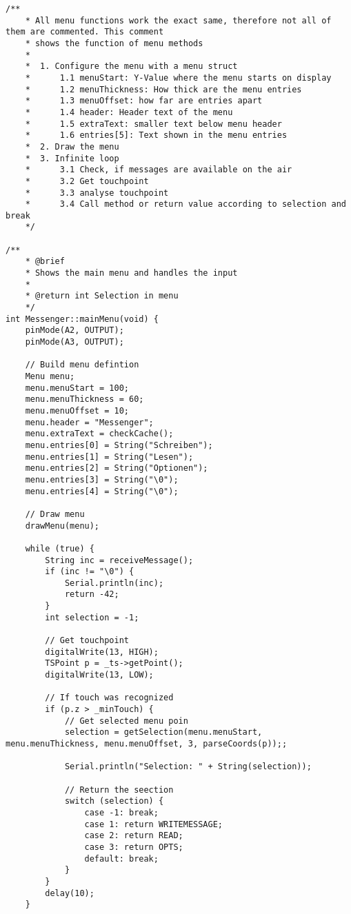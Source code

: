 \documentclass[a4paper, 11pt]{scrartcl}
\begin{document}
\begin{lstlisting}
/**
    * All menu functions work the exact same, therefore not all of them are commented. This comment
    * shows the function of menu methods
    * 
    *  1. Configure the menu with a menu struct
    *      1.1 menuStart: Y-Value where the menu starts on display
    *      1.2 menuThickness: How thick are the menu entries
    *      1.3 menuOffset: how far are entries apart
    *      1.4 header: Header text of the menu
    *      1.5 extraText: smaller text below menu header
    *      1.6 entries[5]: Text shown in the menu entries
    *  2. Draw the menu
    *  3. Infinite loop
    *      3.1 Check, if messages are available on the air
    *      3.2 Get touchpoint
    *      3.3 analyse touchpoint
    *      3.4 Call method or return value according to selection and break
    */

/**
    * @brief
    * Shows the main menu and handles the input
    * 
    * @return int Selection in menu
    */
int Messenger::mainMenu(void) {
    pinMode(A2, OUTPUT);
    pinMode(A3, OUTPUT);

    // Build menu defintion
    Menu menu;
    menu.menuStart = 100;
    menu.menuThickness = 60;
    menu.menuOffset = 10;
    menu.header = "Messenger";
    menu.extraText = checkCache();
    menu.entries[0] = String("Schreiben");
    menu.entries[1] = String("Lesen");
    menu.entries[2] = String("Optionen");
    menu.entries[3] = String("\0");
    menu.entries[4] = String("\0");

    // Draw menu
    drawMenu(menu);

    while (true) {
        String inc = receiveMessage();
        if (inc != "\0") {
            Serial.println(inc);
            return -42;
        }
        int selection = -1;
        
        // Get touchpoint
        digitalWrite(13, HIGH);
        TSPoint p = _ts->getPoint();
        digitalWrite(13, LOW);

        // If touch was recognized
        if (p.z > _minTouch) {
            // Get selected menu poin
            selection = getSelection(menu.menuStart, menu.menuThickness, menu.menuOffset, 3, parseCoords(p));;

            Serial.println("Selection: " + String(selection));
            
            // Return the seection
            switch (selection) {
                case -1: break;
                case 1: return WRITEMESSAGE;
                case 2: return READ;
                case 3: return OPTS;
                default: break;
            }
        }
        delay(10);
    }


\end{lstlisting}
\end{document}
